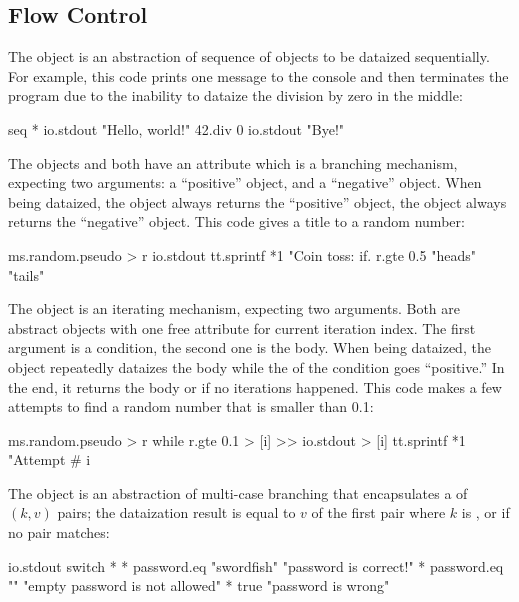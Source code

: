 
\subsection{Flow Control}\label{sec:flow}

The  object is an abstraction of sequence of objects
  to be dataized sequentially.
For example, this code prints one message to the console
  and then terminates the program due to
  the inability to dataize the division by zero in the middle:

\begin{ffcode}
seq *
  io.stdout "Hello, world!"
  42.div 0
  io.stdout "Bye!"
\end{ffcode}

The objects  and  both have
  an attribute  which is a branching mechanism,
  expecting two arguments: a ``positive'' object, and a ``negative'' object.
When being dataized, the object  always returns
  the ``positive'' object, the object  always
  returns the ``negative'' object.
This code gives a title to a random number:

\begin{ffcode}
ms.random.pseudo > r
io.stdout
  tt.sprintf *1
    "Coin toss: %
    if.
      r.gte 0.5
      "heads"
      "tails"
\end{ffcode}

The  object is an iterating mechanism, expecting two arguments.
Both are abstract objects with one free attribute for current iteration index.
The first argument is a condition, the second one is the body.
When being dataized, the object  repeatedly dataizes
  the body while the  of the condition goes ``positive.''
In the end, it returns the body or  if no iterations happened.
This code makes a few attempts to find a random number
  that is smaller than 0.1:

\begin{ffcode}
ms.random.pseudo > r
while
  r.gte 0.1 > [i] >>
  io.stdout > [i]
    tt.sprintf *1
      "Attempt #%
      i
\end{ffcode}

The  object is an abstraction of multi-case
  branching that encapsulates a  of \((k, v)\) pairs;
  the dataization result is equal to \(v\) of the first pair where
  \(k\) is , or  if no pair matches:

\begin{ffcode}
io.stdout
  switch *
    *
      password.eq "swordfish"
      "password is correct!"
    *
      password.eq ""
      "empty password is not allowed"
    *
      true
      "password is wrong"
\end{ffcode}
